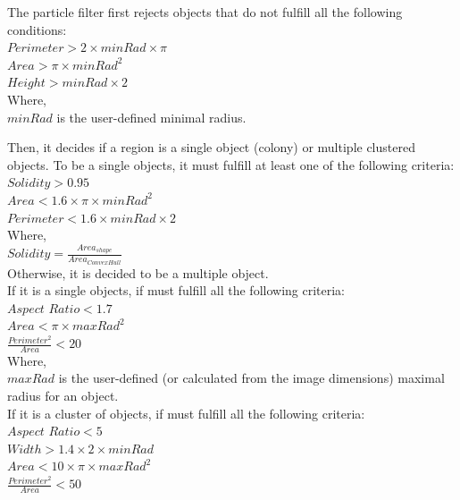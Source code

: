 \documentclass[10pt]{article}
\begin{document}
The particle filter first rejects objects that do not fulfill all the following conditions:\\
\newline{}
$Perimeter > 2\times{}minRad\times{}\pi $\\
$Area > \pi\times{}{minRad}^2$\\
$Height > minRad\times{}2$\\
\newline{}
Where,\\ 
$minRad$ is the user-defined minimal radius.

Then, it decides if a region is a single object (colony) or multiple clustered
objects. To be a single objects, it must fulfill at least one of the following
criteria:\\
\newline{}
$Solidity > 0.95$\\
$Area <  1.6 \times{}\pi\times{}{minRad}^2$\\
$Perimeter < 1.6 \times{} minRad\times{}2$\\
\newline{}
Where,\\ $Solidity = \frac{Area_{shape}}{Area_{ConvexHull}}$\\
\newline{}
Otherwise, it is decided to be a multiple object.\\

If it is a single objects, if must fulfill all the following criteria:\\
\newline{}
$Aspect$ $Ratio < 1.7$\\
$Area <  \pi\times{}{maxRad}^2$\\
$\frac{Perimeter^2}{Area} < 20$\\
\newline{}
Where,\\
$maxRad$ is the user-defined (or calculated from the image dimensions) maximal radius for an object.\\

If it is a cluster of objects, if must fulfill all the following criteria:\\
\newline{}
$Aspect$ $Ratio < 5$\\
$Width > 1.4\times{}2\times{}minRad $\\
$Area < 10 \times{}\pi\times{}{maxRad}^2$\\
$\frac{Perimeter^2}{Area} < 50$\\
\newline{}
\end{document}

